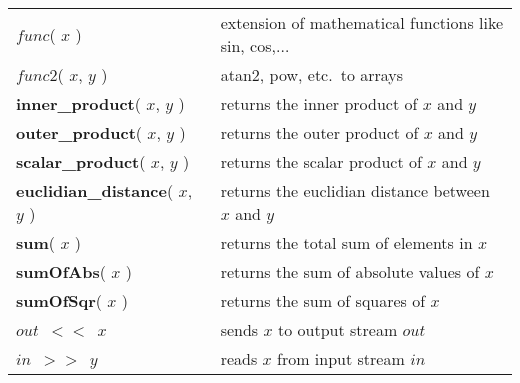 \begin{tabular}{l|l}
\hline
$func$( $x$ ) & extension of mathematical functions like sin, cos,$\dots$\\
$func2$( $x$, $y$ ) &  atan2, pow, etc.\ to arrays\\
\hline
{\sffamily\bfseries\small inner\_product}( $x$, $y$ ) & returns the inner product of $x$ and $y$\\
{\sffamily\bfseries\small outer\_product}( $x$, $y$ ) & returns the outer product of $x$ and $y$\\
{\sffamily\bfseries\small scalar\_product}( $x$, $y$ ) & returns the scalar product of $x$ and $y$\\
{\sffamily\bfseries\small euclidian\_distance}( $x$, $y$ ) & returns the euclidian distance between $x$ and $y$\\
\hline
{\sffamily\bfseries\small sum}( $x$ ) & returns the total sum of elements in $x$\\
{\sffamily\bfseries\small sumOfAbs}( $x$ ) & returns the sum of absolute values of $x$\\
{\sffamily\bfseries\small sumOfSqr}( $x$ ) & returns the sum of squares of $x$\\
\hline
$out$~$<<$~$x$ & sends $x$ to output stream $out$\\
$in$~$>>$~$y$ & reads $x$ from input stream $in$\\
\hline
\end{tabular}
